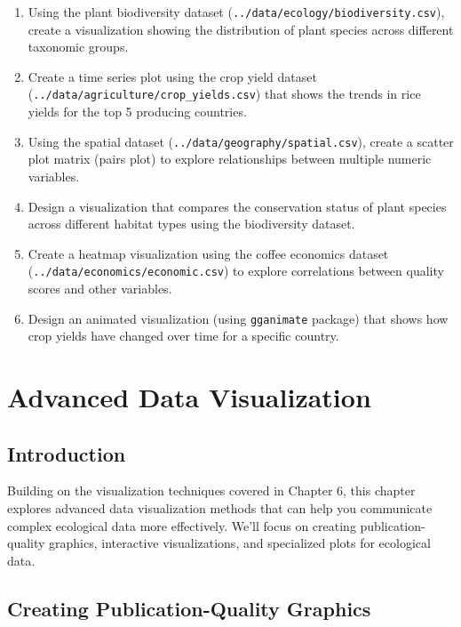 \documentclass[
  letterpaper,
]{book}
\begin{document}
\begin{enumerate}
\def\labelenumi{\arabic{enumi}.}
\item
  Using the plant biodiversity dataset
  (\texttt{../data/ecology/biodiversity.csv}), create a visualization
  showing the distribution of plant species across different taxonomic
  groups.
\item
  Create a time series plot using the crop yield dataset
  (\texttt{../data/agriculture/crop\_yields.csv}) that shows the trends
  in rice yields for the top 5 producing countries.
\item
  Using the spatial dataset (\texttt{../data/geography/spatial.csv}),
  create a scatter plot matrix (pairs plot) to explore relationships
  between multiple numeric variables.
\item
  Design a visualization that compares the conservation status of plant
  species across different habitat types using the biodiversity dataset.
\item
  Create a heatmap visualization using the coffee economics dataset
  (\texttt{../data/economics/economic.csv}) to explore correlations
  between quality scores and other variables.
\item
  Design an animated visualization (using \texttt{gganimate} package)
  that shows how crop yields have changed over time for a specific
  country.
\end{enumerate}

\chapter{Advanced Data Visualization}\label{advanced-data-visualization}

\section{Introduction}\label{introduction-5}

Building on the visualization techniques covered in Chapter 6, this
chapter explores advanced data visualization methods that can help you
communicate complex ecological data more effectively. We'll focus on
creating publication-quality graphics, interactive visualizations, and
specialized plots for ecological data.

\section{Creating Publication-Quality
Graphics}\label{creating-publication-quality-graphics}
\end{document}
